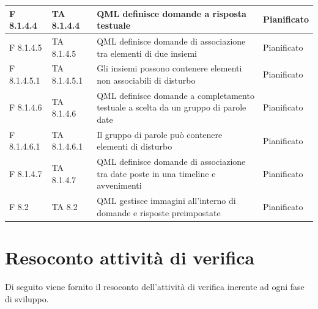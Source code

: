 \documentclass[a4paper,11pt]{article}
\begin{document}
\begin{longtable}{p{}p{}p{}p{}}
\midrule
F 8.1.4.4 & TA 8.1.4.4 &QML definisce domande a risposta testuale & Pianificato\\
\midrule
F 8.1.4.5 & TA 8.1.4.5 &QML definisce domande di associazione tra elementi di due insiemi & Pianificato\\
\midrule
F 8.1.4.5.1 &TA 8.1.4.5.1 &Gli insiemi possono contenere elementi non associabili di disturbo & Pianificato\\
\midrule
F 8.1.4.6 & TA 8.1.4.6&QML definisce domande a completamento testuale a scelta da un gruppo di parole date & Pianificato\\
\midrule
F 8.1.4.6.1 & TA 8.1.4.6.1 &Il gruppo di parole può contenere elementi di disturbo & Pianificato\\
\midrule
F 8.1.4.7 & TA 8.1.4.7&QML definisce domande di associazione tra date poste in una timeline e avvenimenti & Pianificato\\
\midrule
F 8.2 &TA 8.2 &QML gestisce immagini all'interno di domande e risposte preimpostate & Pianificato\\
			
\end{longtable}
\section{Resoconto attività di verifica}
\label{Appendice C}
Di seguito viene fornito il resoconto dell'attività di verifica inerente ad ogni fase di sviluppo.
\end{document}
